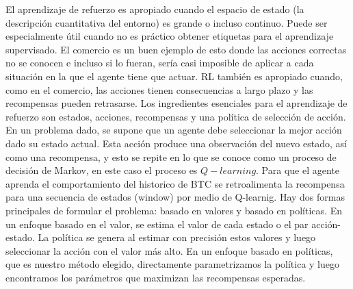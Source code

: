 \documentclass[12pt,letterpaper]{article}
\begin{document}
El aprendizaje de refuerzo es apropiado cuando el espacio de estado (la descripción cuantitativa del
entorno) es grande o incluso continuo. Puede ser especialmente útil cuando no es práctico obtener
etiquetas para el aprendizaje supervisado. El comercio es un buen ejemplo de esto donde las acciones
correctas no se conocen e incluso si lo fueran, sería casi imposible de aplicar a cada situación en la que
el agente tiene que actuar. RL también es apropiado cuando, como en el comercio, las acciones tienen
consecuencias a largo plazo y las recompensas pueden retrasarse. Los ingredientes esenciales para el
aprendizaje de refuerzo son estados, acciones, recompensas y una política de selección de acción. En
un problema dado, se supone que un agente debe seleccionar la mejor acción dado su estado actual.
Esta acción produce una observación del nuevo estado, así como una recompensa, y esto se repite en lo
que se conoce como un proceso de decisión de Markov, en este caso el proceso es $Q-learning$. Para que el agente aprenda el comportamiento del historico de BTC se retroalimenta la recompensa para una secuencia de estados (window) por medio de Q-learnig. Hay dos formas principales de formular el problema: basado en valores y
basado en políticas. En un enfoque basado en el valor, se estima el valor de cada estado o el par
acción- estado. La política se genera al estimar con precisión estos valores y luego seleccionar la acción
con el valor más alto. En un enfoque basado en políticas, que es nuestro método elegido, directamente
parametrizamos la política y luego encontramos los parámetros que maximizan las recompensas
esperadas.
\end{document}
